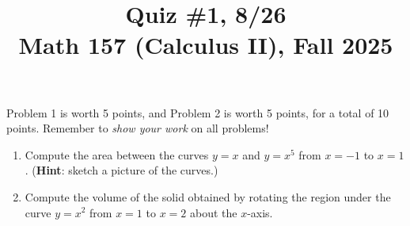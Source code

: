\documentclass[11pt]{article}
\title{Quiz \#1, 8/26 \\ Math 157 (Calculus II), Fall 2025}
\date{}
\begin{document}
\maketitle

\thispagestyle{empty}

\vspace{-2cm}

Problem 1 is worth 5 points, and Problem 2 is worth 5 points, for a total of 10 points. Remember to \emph{show your work} on all problems!

\begin{enumerate}
\item Compute the area between the curves $y=x$ and $y=x^5$ from $x=-1$ to $x=1$. ({\bf Hint}: sketch a picture of the curves.)

\vspace{8cm}

\item Compute the volume of the solid obtained by rotating the region under the curve $y=x^2$ from $x=1$ to $x=2$ about the $x$-axis.

\end{enumerate}
\end{document}
